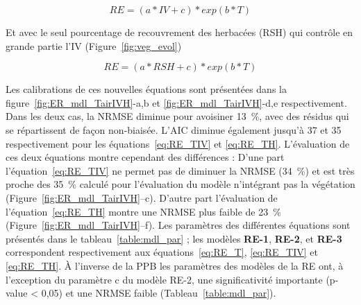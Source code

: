 \begin{equation} \label{eq:RE_TIV}
RE = (a*IV + c)*exp(b*T)
\end{equation}

Et avec le seul pourcentage de recouvrement des herbacées (RSH) qui contrôle en grande partie l'IV (Figure~\ref{fig:veg_evol})

\begin{equation} \label{eq:RE_TH}
RE = (a*RSH + c)*exp(b*T)
\end{equation}

Les calibrations de ces nouvelles équations sont présentées dans la figure~\ref{fig:ER_mdl_TairIVH}-a,b et \ref{fig:ER_mdl_TairIVH}-d,e respectivement.
Dans les deux cas, la NRMSE diminue pour avoisiner \SI{13}{\percent}, avec des résidus qui se répartissent de façon non-biaisée.
L'AIC diminue également jusqu'à 37 et 35 respectivement pour les équations~\ref{eq:RE_TIV} et \ref{eq:RE_TH}.
L'évaluation de ces deux équations montre cependant des différences :
D'une part l'équation~\ref{eq:RE_TIV} ne permet pas de diminuer la NRMSE (\SI{34}{\percent}) et est très proche des \SI{35}{\percent} calculé pour l'évaluation du modèle n'intégrant pas la végétation (Figure~\ref{fig:ER_mdl_TairIVH}--c).
D'autre part l'évaluation de l'équation~\ref{eq:RE_TH} montre une NRMSE plus faible de \SI{23}{\percent} (Figure~\ref{fig:ER_mdl_TairIVH}--f).
Les paramètres des différentes équations sont présentés dans le tableau~\ref{table:mdl_par} ; les modèles \textbf{RE-1}, \textbf{RE-2}, et \textbf{RE-3} correspondent respectivement aux équations~\ref{eq:RE_T}, \ref{eq:RE_TIV} et \ref{eq:RE_TH}.
À l'inverse de la PPB les paramètres des modèles de la RE ont, à l'exception du paramètre c du modèle RE-2, une significativité importante (p-value < 0,05) et une NRMSE faible (Tableau~\ref{table:mdl_par}).



%

